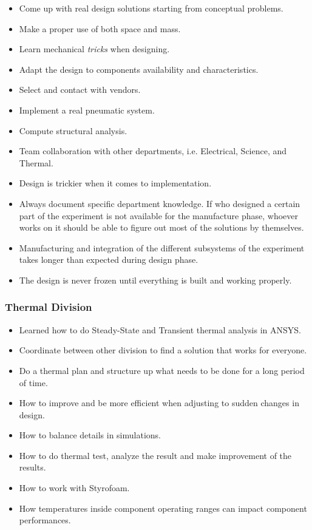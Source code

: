 \begin{itemize}
    \item Come up with real design solutions starting from conceptual problems.
    \item Make a proper use of both space and mass.
    \item Learn mechanical \textit{tricks} when designing.
    \item Adapt the design to components availability and characteristics.
    \item Select and contact with vendors.
    \item Implement a real pneumatic system. 
    \item Compute structural analysis.
    \item Team collaboration with other departments, i.e. Electrical, Science, and Thermal.
    \item Design is trickier when it comes to implementation.
    \item Always document specific department knowledge. If who designed a certain part of the experiment is not available for the manufacture phase, whoever works on it should be able to figure out most of the solutions by themselves.
    \item Manufacturing and integration of the different subsystems of the experiment takes longer than expected during design phase.
    \item The design is never frozen until everything is built and working properly.
\end{itemize}

\subsubsection{Thermal Division}
\begin{itemize}
    \item Learned how to do Steady-State and Transient thermal analysis in ANSYS.
    \item Coordinate between other division to find a solution that works for everyone.
    \item Do a thermal plan and structure up what needs to be done for a long period of time.
    \item How to improve and be more efficient when adjusting to sudden changes in design.
    \item How to balance details in simulations.
    \item How to do thermal test, analyze the result and make improvement of the results.
    \item How to work with Styrofoam.
    \item How temperatures inside component operating ranges can impact component performances.
\end{itemize}